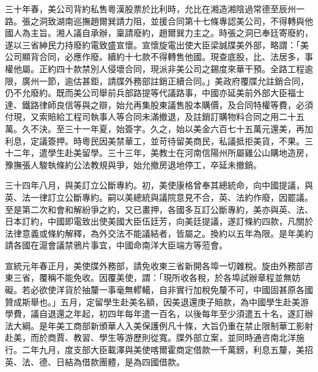 \begin{pinyinscope}
三十年春，美公司背約私售粵漢股票於比利時，允比在湘造湘陰過常德至辰州一路。張之洞致湖南巡撫趙爾巽請力阻，並援合同第十七條專認美公司，不得轉與他國人為主旨。湘人議自承辦，稟請廢約，趙爾巽力主之。時張之洞已奉廷寄廢約，遂以三省紳民力持廢約電致盛宣懷。宣懷旋電出使大臣梁誠牒美外部，略謂：「美公司顯背合同，必應作廢。續約十七款不得轉售他國。現查底股，比、法居多，事權他屬。正約四十款禁別人侵壞合同，現派非美公司之錫度來華干預。全路工程逾限，廣州一節，逾估甚鉅，請牒外務部註銷正續合同。」美政府覆牒允註銷合同，仍不允廢約。既而美公司舉前兵部路提等代議路事，中國亦延美前外部大臣福士達、鐵路律師良信等與之辯，始允再集股東議售股本購價，及合同特權等費，必須付現，又索賠給工程司執事人等合同未滿撤退，及註銷訂購物料合同之用二十五萬。久不決。至三十一年夏，始簽字。久之，始以美金六百七十五萬元還美，再加利息，定議簽押。時粵民因美禁華工，並苛待留美商民，私議抵拒美貨，不果。三十二年，遣學生赴美留學。三十三年，美教士在河南信陽州所屬雞公山購地造房，豫撫張人駿執條約公法教規與爭，始允撤房退地停工，卒延未撤銷。

三十四年八月，與美訂立公斷專約。初，美使康格曾奉其總統命，向中國提議，與英、法一律訂立公斷專約。嗣以美總統與議院意見不合，英、法約作廢，因罷議。至是第二次和會和解紛爭之約，又已畫押，各國多互訂公斷專約，美亦與英、法、日本訂約，中國即電致出使美國大臣伍廷芳，向美廷提議，遂訂條約四款，凡關於法律意義或條約解釋，為外交法不能議結者，皆屬之。換約以五年為限。是年美約請各國在滬會議禁鴉片事宜，中國命南洋大臣端方等蒞會。

宣統元年春正月，美使牒外務部，請免收東三省新開各埠一切雜稅。旋由外務部咨東三省，覆稱不能免收。因覆美使，謂：「現所收各稅，於各埠試辦章程並無妨礙。若必欲使洋貨於抽釐一事毫無轇轕，自非實行加稅免釐不可，中國固甚原各國贊成斯舉也。」五月，定留學生赴美名額，因美退還庚子賠款，為中國學生赴美游學費，議自退還之年起，初四年每年遣一百名，以後每年至少須遣五十名，遂訂辦法大綱。是年美工商部新頒華人入美保護例凡十條，大旨仍重在禁止限制華工影射赴美，而於商賈、教習、學生等游歷則從寬。牒外部立案，並同時通咨南北洋施行。二年九月，度支部大臣載澤與美使喀爾霍商定借款一千萬鎊，利息五釐，美招英、法、德、日結為借款團體，是為四國借款。


\end{pinyinscope}